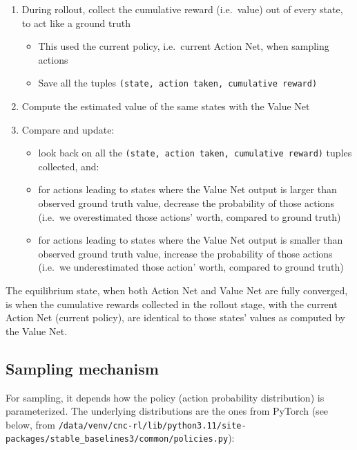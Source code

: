 \documentclass[
  letterpaper,
  DIV=11,
  numbers=noendperiod]{scrartcl}
\providecommand{\tightlist}{%
  \setlength{\itemsep}{0pt}\setlength{\parskip}{0pt}}\usepackage{longtable,booktabs,array}
\begin{document}
\begin{enumerate}
\def\labelenumi{\arabic{enumi}.}
\tightlist
\item
  During rollout, collect the cumulative reward (i.e.~value) out of
  every state, to act like a ground truth

  \begin{itemize}
  \tightlist
  \item
    This used the current policy, i.e.~current Action Net, when sampling
    actions
  \item
    Save all the tuples
    \texttt{(state,\ action\ taken,\ cumulative\ reward)}
  \end{itemize}
\item
  Compute the estimated value of the same states with the Value Net
\item
  Compare and update:

  \begin{itemize}
  \tightlist
  \item
    look back on all the
    \texttt{(state,\ action\ taken,\ cumulative\ reward)} tuples
    collected, and:
  \item
    for actions leading to states where the Value Net output is larger
    than observed ground truth value, decrease the probability of those
    actions (i.e.~we overestimated those actions' worth, compared to
    ground truth)
  \item
    for actions leading to states where the Value Net output is smaller
    than observed ground truth value, increase the probability of those
    actions (i.e.~we underestimated those action' worth, compared to
    ground truth)
  \end{itemize}
\end{enumerate}

The equilibrium state, when both Action Net and Value Net are fully
converged, is when the cumulative rewards collected in the rollout
stage, with the current Action Net (current policy), are identical to
those states' values as computed by the Value Net.

\hypertarget{sampling-mechanism}{%
\subsection{Sampling mechanism}\label{sampling-mechanism}}

For sampling, it depends how the policy (action probability
distribution) is parameterized. The underlying distributions are the
ones from PyTorch (see below, from
\texttt{/data/venv/cnc-rl/lib/python3.11/site-packages/stable\_baselines3/common/policies.py}):
\end{document}
